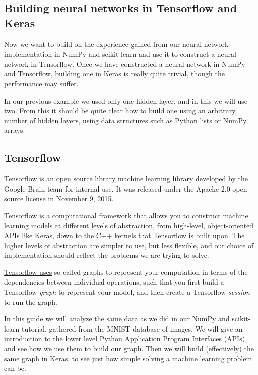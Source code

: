 \documentclass[%
oneside,                 %
final,                   %
10pt]{article}
\begin{document}
\subsection{Building neural networks in Tensorflow and Keras}

Now we want  to build on the experience gained from our neural network implementation in NumPy and scikit-learn
and use it to construct a neural network in Tensorflow. Once we have constructed a neural network in NumPy
and Tensorflow, building one in Keras is really quite trivial, though the performance may suffer.  

In our previous example we used only one hidden layer, and in this we will use two. From this it should be quite
clear how to build one using an arbitrary number of hidden layers, using data structures such as Python lists or
NumPy arrays.

\subsection{Tensorflow}

Tensorflow is an open source library machine learning library
developed by the Google Brain team for internal use. It was released
under the Apache 2.0 open source license in November 9, 2015.

Tensorflow is a computational framework that allows you to construct
machine learning models at different levels of abstraction, from
high-level, object-oriented APIs like Keras, down to the C++ kernels
that Tensorflow is built upon. The higher levels of abstraction are
simpler to use, but less flexible, and our choice of implementation
should reflect the problems we are trying to solve.

\href{{https://www.tensorflow.org/guide/graphs}}{Tensorflow uses} so-called graphs to represent your computation
in terms of the dependencies between individual operations, such that you first build a Tensorflow \emph{graph}
to represent your model, and then create a Tensorflow \emph{session} to run the graph.

In this guide we will analyze the same data as we did in our NumPy and
scikit-learn tutorial, gathered from the MNIST database of images. We
will give an introduction to the lower level Python Application
Program Interfaces (APIs), and see how we use them to build our graph.
Then we will build (effectively) the same graph in Keras, to see just
how simple solving a machine learning problem can be.
\end{document}

